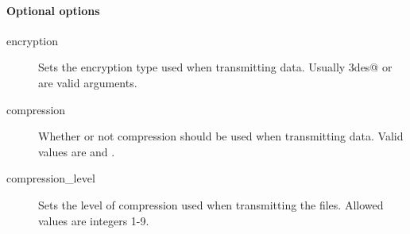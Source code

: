 \paragraph*{Optional options}

\begin{description}
    \item[encryption]   Sets the encryption type used when transmitting data.
        Usually \verb@3des@ or \verb@blowfish@ are valid arguments.
    \item[compression]  Whether or not compression should be used when
        transmitting data. Valid values are \verb@yes@ and \verb@no@.
    \item[compression\_level]   Sets the level of compression used when
        transmitting the files. Allowed values are integers 1-9.
\end{description}

